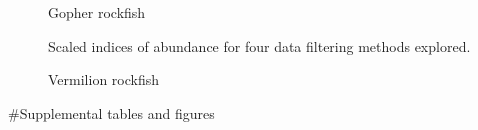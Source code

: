 \documentclass[
  authoryear,
  preprint,
  3p]{elsarticle}
\begin{document}
\begin{figure}
\begin{minipage}[t]{0.50\linewidth}
{{}

\caption{\label{fig-gopher-indices}Gopher rockfish}

}

\end{minipage}%
%
\begin{minipage}[t]{0.50\linewidth}

{\centering 


\caption{\label{fig-vermilion-indices}Vermilion rockfish}

}

\end{minipage}%
\newline
\begin{minipage}[t]{0.50\linewidth}

{\centering 

Scaled indices of abundance for four data filtering methods explored.

}

\end{minipage}%

\end{figure}

\FloatBarrier

\#Supplemental tables and figures
\end{document}
